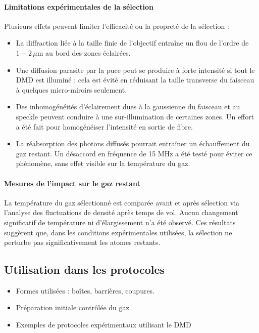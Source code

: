 \paragraph{Limitations expérimentales de la sélection}

Plusieurs effets peuvent limiter l'efficacité ou la propreté de la sélection :
\begin{itemize}
    \item La diffraction liée à la taille finie de l’objectif entraîne un flou de l’ordre de \(1{-}2\,\mu\)m au bord des zones éclairées.
    \item Une diffusion parasite par la puce peut se produire à forte intensité si tout le DMD est illuminé ; cela est évité en réduisant la taille transverse du faisceau à quelques micro-miroirs seulement.
    \item Des inhomogénéités d’éclairement dues à la gaussienne du faisceau et au speckle peuvent conduire à une sur-illumination de certaines zones. Un effort a été fait pour homogénéiser l’intensité en sortie de fibre.
    \item La réabsorption des photons diffusés pourrait entraîner un échauffement du gaz restant. Un désaccord en fréquence de 15 MHz a été testé pour éviter ce phénomène, sans effet visible sur la température du gaz.
\end{itemize}

\paragraph{Mesures de l’impact sur le gaz restant}

La température du gaz sélectionné est comparée avant et après sélection via l’analyse des fluctuations de densité après temps de vol. Aucun changement significatif de température ni d’élargissement n’a été observé. Ces résultats suggèrent que, dans les conditions expérimentales utilisées, la sélection ne perturbe pas significativement les atomes restants.




\subsection{Utilisation dans les protocoles}

{\color{blue}
\begin{itemize}
    \item Formes utilisées : boîtes, barrières, coupures.
    \item Préparation initiale contrôlée du gaz.
    \item Exemples de protocoles expérimentaux utilisant le DMD
\end{itemize}
}

